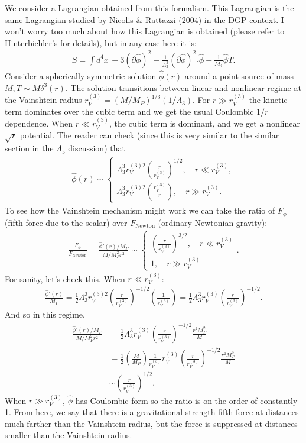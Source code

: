 \documentclass{book}
\theoremstyle{definition}
\newcommand{\p}{\partial}
\newcommand{\nn}{\nonumber}
\newcommand{\f}[2]{\frac{#1}{#2}}
\newcommand{\lp}{\left(}
\newcommand{\rp}{\right)}
\begin{document}
We consider a Lagrangian obtained from this formalism. This Lagrangian is the same Lagrangian studied by Nicolis \& Rattazzi (2004) in the DGP context. I won't worry too much about how this Lagrangian is obtained (please refer to Hinterbichler's for details), but in any case here it is:
\begin{align}
S = \int d^4x\, -3(\p \hat{\phi})^2 - \f{1}{\Lambda_3^3}(\p \hat{\phi})^2 \square \hat{\phi} + \f{1}{M_4}\hat{\phi}T.
\end{align}
Consider a spherically symmetric solution $\hat{\phi}(r)$ around a point source of mass $M,T \sim M \delta^3(r)$. The solution transitions between linear and nonlinear regime at the Vainshtein radius $r_V^{(3)} = (M/M_P)^{1/3} (1/\Lambda_3)$. For $r \gg r_V^{(3)}$ the kinetic term dominates over the cubic term and we get the usual Coulombic $1/r$ dependence. When $r \ll r_V^{(3)}$, the cubic term is dominant, and we get a nonlinear $\sqrt{r}$ potential. The reader can check (since this is very similar to the similar section in the $\Lambda_5$ discussion) that
\begin{align}
\hat{\phi}(r) \sim \begin{cases}
\Lambda_3^3 r_V^{(3)2}\lp \f{r}{r_V^{(3)}}\rp^{1/2},\quad r \ll r_V^{(3)},\\
\Lambda_3^3 r_V^{(3)2}\lp \f{r_V^{(3)}}{r}  \rp,\quad r \gg r_V^{(3)}.
\end{cases}
\end{align}
To see how the Vainshtein mechanism might work we can take the ratio of $F_\phi$ (fifth force due to the scalar) over $F_\text{Newton}$ (ordinary Newtonian gravity):
\begin{align}
\f{F_\phi}{F_\text{Newton}} = \f{\hat{\phi}'(r)/M_P}{M/M_P^2r^2} \sim \begin{cases}
\lp \f{r}{r_V^{(3)}} \rp^{3/2},\quad r\ll r_V^{(3)}\\
1, \quad r \gg r_V^{(3)}
\end{cases}.
\end{align}
For sanity, let's check this. When $r \ll r_V^{(3)}$:
\begin{align}
\f{\hat{\phi}'(r)}{M_P} = \f{1}{2}\Lambda_3^3 r_V^{(3)2}\lp  \f{r}{r_V^{(3)}}\rp^{-1/2}\lp \f{1}{r_V^{(3)}} \rp = \f{1}{2}\Lambda_3^3 r_V^{(3)}\lp  \f{r}{r_V^{(3)}}\rp^{-1/2}. 
\end{align}
And so in this regime,
\begin{align}
\frac{{\hat{\phi}'(r)/M_P}}{M/M_P^2r^2} &= \f{1}{2}\Lambda_3^3 r_V^{(3)}\lp  \f{r}{r_V^{(3)}}\rp^{-1/2}\f{r^2 M_P^2}{M}\nn\\
&= \f{1}{2}\lp \f{M}{M_P} \rp  \f{1}{r_V^{(3)}} r_V^{(3)}\lp  \f{r}{r_V^{(3)}}\rp^{-1/2}\f{r^2 M_P^2}{M} \nn\\
&\sim \lp \f{r}{r_V^{(3)}} \rp^{1/2}. 
\end{align}
When $r \gg r_V^{(3)}$, $\hat{\phi}$ has Coulombic form so the ratio is on the order of constantly 1. From here, we say that there is a gravitational strength fifth force at distances much farther than the Vainshtein radius, but the force is suppressed at distances smaller than the Vainshtein radius. \\
\end{document}
